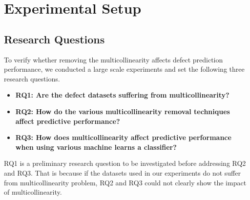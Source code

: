 \chapter{Experimental Setup}
\thispagestyle{fancy}
\label{sec:experimentalsetup}
\bigskip
\section{ Research Questions}
To verify whether removing the multicollinearity affects defect prediction performance, we conducted a large scale experiments 
and set the following three research questions.
\begin{itemize}
  \item \textbf{RQ1: Are the defect datasets suffering from multicollinearity?}
  \item \textbf{RQ2: How do the various multicollinearity removal techniques affect predictive performance?}
  \item \textbf{RQ3: How does multicollinearity affect predictive performance when using various machine learns a classifier?}
\end{itemize}
RQ1 is a preliminary research question to be investigated before addressing RQ2 and RQ3. That is because if the datasets used in our experiments do not suffer from multicollinearity problem, RQ2 and RQ3 could not clearly show the impact of multicollinearity. 

